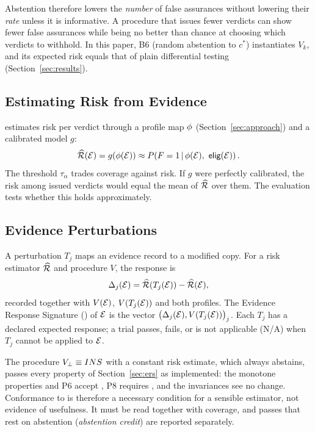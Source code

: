 Abstention therefore lowers the \emph{number} of false assurances without lowering their \emph{rate} unless it is informative. A procedure that issues fewer verdicts can show fewer false assurances while being no better than chance at choosing which verdicts to withhold. In this paper, B6 (random abstention to $c^\ast$) instantiates $V_k$, and its expected risk equals that of plain differential testing (Section~\ref{sec:results}).

\subsection{Estimating Risk from Evidence}
\sbg{} estimates risk per verdict through a profile map $\phi$ (Section~\ref{sec:approach}) and a calibrated model $g$:
\begin{equation}
\widehat{\mathcal{R}}(\mathcal{E})=g\!\left(\phi(\mathcal{E})\right)\approx P\!\left(F=1\,\middle|\,\phi(\mathcal{E}),\ \textsf{elig}(\mathcal{E})\right).
\label{eq:rhat}
\end{equation}
The threshold $\tau_\alpha$ trades coverage against risk. If $g$ were perfectly calibrated, the risk among issued verdicts would equal the mean of $\widehat{\mathcal{R}}$ over them. The evaluation tests whether this holds approximately.

\subsection{Evidence Perturbations}
\begin{definition}
A perturbation $T_j$ maps an evidence record to a modified copy. For a risk estimator $\widehat{\mathcal{R}}$ and procedure $V$, the response is
\begin{equation}
\Delta_j(\mathcal{E})=\widehat{\mathcal{R}}\!\left(T_j(\mathcal{E})\right)-\widehat{\mathcal{R}}(\mathcal{E}),
\label{eq:delta}
\end{equation}
recorded together with $V(\mathcal{E})$, $V(T_j(\mathcal{E}))$ and both profiles. The Evidence Response Signature (\ers{}) of $\mathcal{E}$ is the vector $\big(\Delta_j(\mathcal{E}),V(T_j(\mathcal{E}))\big)_j$. Each $T_j$ has a declared expected response; a trial passes, fails, or is not applicable (N/A) when $T_j$ cannot be applied to $\mathcal{E}$.
\end{definition}

\begin{remark}\label{rem:vacuous}
The procedure $V_\bot\equiv INS{}$ with a constant risk estimate, which always abstains, passes every property of Section~\ref{sec:ers} as implemented: the monotone properties and P6 accept \INS{}, P8 requires \INS{}, and the invariances see no change. Conformance to \ers{} is therefore a necessary condition for a sensible estimator, not evidence of usefulness. It must be read together with coverage, and passes that rest on abstention (\emph{abstention credit}) are reported separately.
\end{remark}

